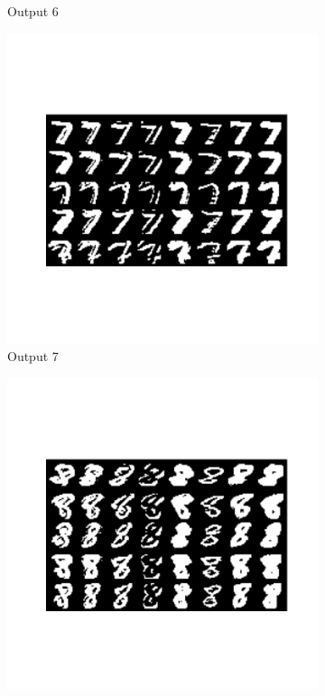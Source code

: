 \documentclass{assignment}
\begin{document}
\begin{figure}[htbp!]
\begin{subfigure}{0.3\textwidth}
        \caption{Output 6}
    \end{subfigure}
    \hfill
    \begin{subfigure}{0.3\textwidth}
        \includegraphics[width=\textwidth]{figures/out_7.png}
        \caption{Output 7}
    \end{subfigure}\hfill
    \begin{subfigure}{0.3\textwidth}
        \includegraphics[width=\textwidth]{figures/out_8.png}

\end{subfigure}
\end{figure}
\end{document}

